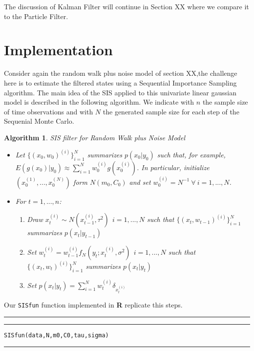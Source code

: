 \documentclass[
]{article}
\newtheorem{algorithm}{Algorithm}[section]
\begin{document}
The discussion of Kalman Filter will continue in Section XX where we
compare it to the Particle Filter.

\hfill\break

\section{Implementation}

Consider again the random walk plus noise model of section XX,the
challenge here is to estimate the filtered states using a Sequential
Importance Sampling algorithm. The main idea of the SIS applied to this
univariate linear gaussian model is described in the following
algorithm. We indicate with \(n\) the sample size of time observations
and with \(N\) the generated sample size for each step of the Sequenial
Monte Carlo.

\begin{algorithm} SIS filter for Random Walk plus Noise Model
\begin{itemize}
\item Let $\{(x_{0},w_{0})^{(i)}\}_{i=1}^{N}$ summarizes $p(x_{0}|y_{0})$ such that, for example, $E(g(x_{0})|y_{0}) \approx \sum_{i=1}^{N}w_{0}^{(i)}g(x_{0}^{(i)})$. In particular, initialize $(x_{0}^{(1)},...,x_{0}^{(N)})$ form $N(m_{0},C_{0})$ and set $w_{0}^{(i)}=N^{-1} \ \forall \ i=1,...,N$.
\item For $t=1,...,n$:
\begin{enumerate}
\item Draw $x_{t}^{(i)} \sim N(x_{t-1}^{(i)},\tau^2) \ \ i=1,...,N$ such that $\{(x_{t},w_{t-1})^{(i)}\}_{i=1}^{N}$ summarizes $p(x_{t}|y_{t-1})$
\item Set $w_{t}^{(i)} = w_{t-1}^{(i)}f_{N}(y_{t};x_{t}^{(i)},\sigma^2) \ \ i=1,...,N$ such that $\{(x_{t},w_{t})^{(i)}\}_{i=1}^{N}$ summarizes $p(x_{t}|y_{t})$
\item Set $p(x_{t}|y_{t})=\sum_{i=1}^{N}w_{t}^{(i)}\delta_{x_{t}^{(i)}}$
\end{enumerate}
\end{itemize}
\end{algorithm}

Our \texttt{SISfun} function implemented in
\textnormal{\sffamily\bfseries R} replicate this steps.\\

\hrule
\hrule

\hfill\break
\texttt{SISfun(data,N,m0,C0,tau,sigma)}\\

\hrule
\end{document}
